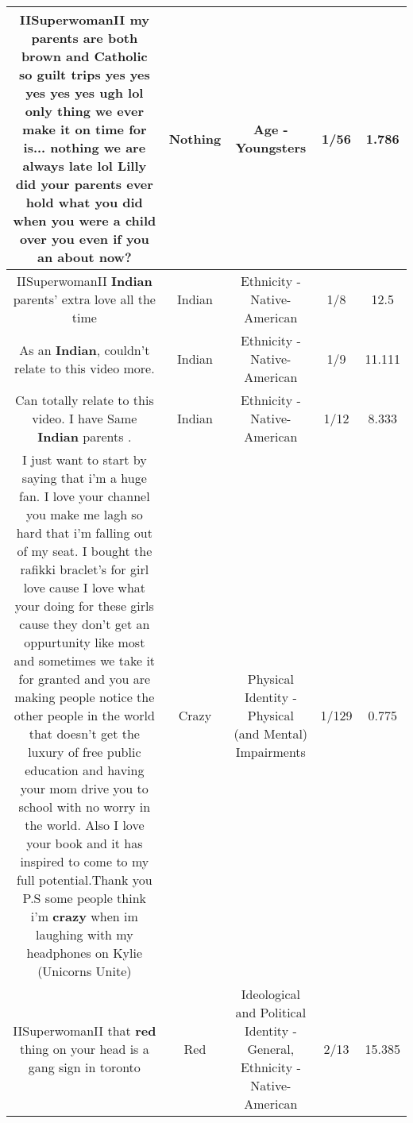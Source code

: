 \documentclass[11pt]{article}
\newlength\mylength
\begin{document}
\begin{center}
\begin{longtable}{|C{.65\mylength}|C{.30\mylength}|C{.12\mylength}|C{.12\mylength}|C{.12\mylength}|}
  \small IISuperwomanII my parents are both brown and Catholic so guilt trips yes yes yes yes yes ugh lol  only thing we ever make it on time for is... \textbf{nothing} we are always late lol Lilly did your parents ever hold what you did when you were a child over you even if you an about now?\normalsize   & Nothing & Age - Youngsters & 1/56 & 1.786 \\  \hline
  \small IISuperwomanII \textbf{Indian} parents' extra love all the time\normalsize   & Indian & Ethnicity - Native-American & 1/8 & 12.5 \\  \hline
  \small As an \textbf{Indian}, couldn't relate to this video more.\normalsize   & Indian & Ethnicity - Native-American & 1/9 & 11.111 \\  \hline
  \small Can totally relate to this video. I have Same \textbf{Indian} parents .\normalsize   & Indian & Ethnicity - Native-American & 1/12 & 8.333 \\  \hline
  \small I just want to start by saying that i'm a huge fan.  I love your channel you make me lagh so hard that i'm falling out of  my seat.  I bought the rafikki braclet's for girl love cause I love what your doing for these girls cause they don't get an oppurtunity like most and sometimes we take it for granted and you are making people notice the other people in the world that doesn't get the luxury of free public education and having your mom drive you to school with no worry in the world.  Also I love your book and it has inspired to come to my full potential.Thank you P.S some people think i'm \textbf{crazy} when im laughing with my headphones on Kylie (Unicorns Unite)\normalsize   & Crazy & Physical Identity - Physical (and Mental) Impairments & 1/129 & 0.775 \\  \hline
  \small IISuperwomanII that \textbf{r\textbf{ed}} thing on your head is a gang sign in toronto\normalsize   & Red &  Ideological and Political Identity - General, Ethnicity - Native-American & 2/13 & 15.385 \\  \hline

\end{longtable}
\end{center}
\end{document}
